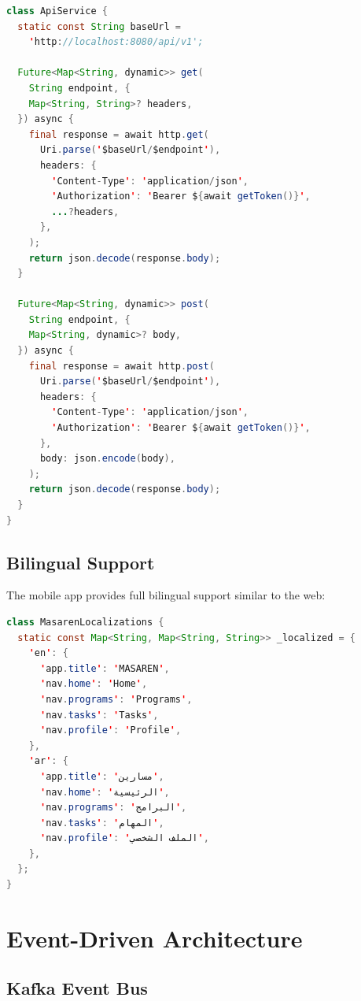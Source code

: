 \documentclass[11pt,a4paper]{article}
\begin{document}
\begin{lstlisting}[language=Java, caption=API Service Layer]
class ApiService {
  static const String baseUrl =
    'http://localhost:8080/api/v1';

  Future<Map<String, dynamic>> get(
    String endpoint, {
    Map<String, String>? headers,
  }) async {
    final response = await http.get(
      Uri.parse('$baseUrl/$endpoint'),
      headers: {
        'Content-Type': 'application/json',
        'Authorization': 'Bearer ${await getToken()}',
        ...?headers,
      },
    );
    return json.decode(response.body);
  }

  Future<Map<String, dynamic>> post(
    String endpoint, {
    Map<String, dynamic>? body,
  }) async {
    final response = await http.post(
      Uri.parse('$baseUrl/$endpoint'),
      headers: {
        'Content-Type': 'application/json',
        'Authorization': 'Bearer ${await getToken()}',
      },
      body: json.encode(body),
    );
    return json.decode(response.body);
  }
}
\end{lstlisting}

\subsection{Bilingual Support}

The mobile app provides full bilingual support similar to the web:

\begin{lstlisting}[language=Java, caption=Internationalization Setup]
class MasarenLocalizations {
  static const Map<String, Map<String, String>> _localized = {
    'en': {
      'app.title': 'MASAREN',
      'nav.home': 'Home',
      'nav.programs': 'Programs',
      'nav.tasks': 'Tasks',
      'nav.profile': 'Profile',
    },
    'ar': {
      'app.title': 'مسارين',
      'nav.home': 'الرئيسية',
      'nav.programs': 'البرامج',
      'nav.tasks': 'المهام',
      'nav.profile': 'الملف الشخصي',
    },
  };
}
\end{lstlisting}

\clearpage

\section{Event-Driven Architecture}

\subsection{Kafka Event Bus}
\end{document}
